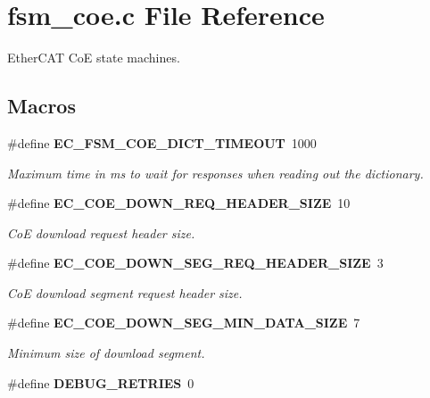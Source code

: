 \section{fsm\-\_\-coe.\-c File Reference}
\label{fsm__coe_8c}


Ether\-C\-A\-T Co\-E state machines.  


\subsection*{Macros}
\begin{DoxyCompactItemize}
\item 
\#define {\bf E\-C\-\_\-\-F\-S\-M\-\_\-\-C\-O\-E\-\_\-\-D\-I\-C\-T\-\_\-\-T\-I\-M\-E\-O\-U\-T}~1000\label{fsm__coe_8c_a9459f4f7c6dc0d811bf9c7c227209afd}

\begin{DoxyCompactList}\small\item\em Maximum time in ms to wait for responses when reading out the dictionary. \end{DoxyCompactList}\item 
\#define {\bf E\-C\-\_\-\-C\-O\-E\-\_\-\-D\-O\-W\-N\-\_\-\-R\-E\-Q\-\_\-\-H\-E\-A\-D\-E\-R\-\_\-\-S\-I\-Z\-E}~10\label{fsm__coe_8c_a184740a02f1c15e830427d85b5f496ee}

\begin{DoxyCompactList}\small\item\em Co\-E download request header size. \end{DoxyCompactList}\item 
\#define {\bf E\-C\-\_\-\-C\-O\-E\-\_\-\-D\-O\-W\-N\-\_\-\-S\-E\-G\-\_\-\-R\-E\-Q\-\_\-\-H\-E\-A\-D\-E\-R\-\_\-\-S\-I\-Z\-E}~3\label{fsm__coe_8c_a3ab909f26c5840a5a39c27705511d104}

\begin{DoxyCompactList}\small\item\em Co\-E download segment request header size. \end{DoxyCompactList}\item 
\#define {\bf E\-C\-\_\-\-C\-O\-E\-\_\-\-D\-O\-W\-N\-\_\-\-S\-E\-G\-\_\-\-M\-I\-N\-\_\-\-D\-A\-T\-A\-\_\-\-S\-I\-Z\-E}~7\label{fsm__coe_8c_a1fa158e9b4d200fb14e9e32b414e463a}

\begin{DoxyCompactList}\small\item\em Minimum size of download segment. \end{DoxyCompactList}\item 
\#define {\bf D\-E\-B\-U\-G\-\_\-\-R\-E\-T\-R\-I\-E\-S}~0\label{fsm__coe_8c_ac8c424f6a0ede98cabd81436c9d2bd65}


\end{DoxyCompactItemize}
